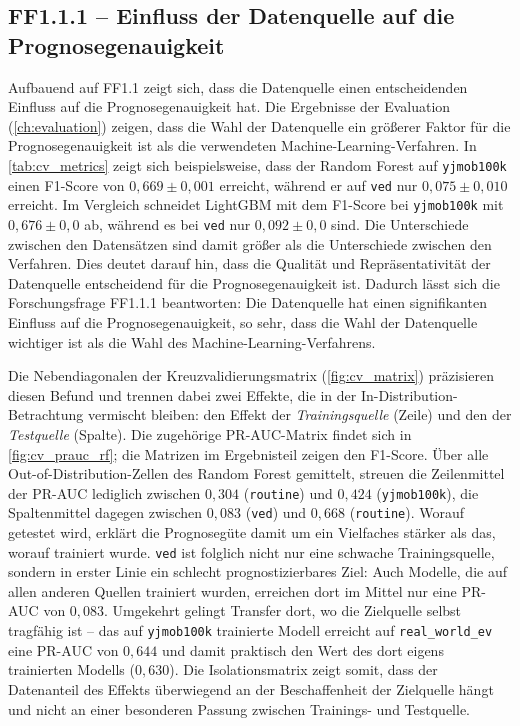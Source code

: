 \subsection{FF1.1.1 -- Einfluss der Datenquelle auf die Prognosegenauigkeit}

Aufbauend auf FF1.1 zeigt sich, dass die Datenquelle einen entscheidenden Einfluss auf die Prognosegenauigkeit hat. Die Ergebnisse der Evaluation (\cref{ch:evaluation}) zeigen, dass die Wahl der Datenquelle ein größerer Faktor für die Prognosegenauigkeit ist als die verwendeten Machine-Learning-Verfahren. In \cref{tab:cv_metrics} zeigt sich beispielsweise, dass der Random Forest auf \texttt{yjmob100k} einen F1-Score von $0,669\pm0,001$ erreicht, während er auf \texttt{ved} nur $0,075\pm0,010$ erreicht. Im Vergleich schneidet LightGBM mit dem F1-Score bei \texttt{yjmob100k} mit $0,676\pm0,0$ ab, während es bei \texttt{ved} nur $0,092\pm0,0$ sind. Die Unterschiede zwischen den Datensätzen sind damit größer als die Unterschiede zwischen den Verfahren. Dies deutet darauf hin, dass die Qualität und Repräsentativität der Datenquelle entscheidend für die Prognosegenauigkeit ist. Dadurch lässt sich die Forschungsfrage FF1.1.1 beantworten: Die Datenquelle hat einen signifikanten Einfluss auf die Prognosegenauigkeit, so sehr, dass die Wahl der Datenquelle wichtiger ist als die Wahl des Machine-Learning-Verfahrens.

Die Nebendiagonalen der Kreuzvalidierungsmatrix (\cref{fig:cv_matrix}) präzisieren diesen Befund und trennen dabei zwei Effekte, die in der In-Distribution-Betrachtung vermischt bleiben: den Effekt der \emph{Trainingsquelle} (Zeile) und den der \emph{Testquelle} (Spalte). Die zugehörige PR-AUC-Matrix findet sich in \cref{fig:cv_prauc_rf}; die Matrizen im Ergebnisteil zeigen den F1-Score. Über alle Out-of-Distribution-Zellen des Random Forest gemittelt, streuen die Zeilenmittel der PR-AUC lediglich zwischen $0,304$ (\texttt{routine}) und $0,424$ (\texttt{yjmob100k}), die Spaltenmittel dagegen zwischen $0,083$ (\texttt{ved}) und $0,668$ (\texttt{routine}). Worauf getestet wird, erklärt die Prognosegüte damit um ein Vielfaches stärker als das, worauf trainiert wurde. \texttt{ved} ist folglich nicht nur eine schwache Trainingsquelle, sondern in erster Linie ein schlecht prognostizierbares Ziel: Auch Modelle, die auf allen anderen Quellen trainiert wurden, erreichen dort im Mittel nur eine PR-AUC von $0,083$. Umgekehrt gelingt Transfer dort, wo die Zielquelle selbst tragfähig ist -- das auf \texttt{yjmob100k} trainierte Modell erreicht auf \texttt{real\_world\_ev} eine PR-AUC von $0,644$ und damit praktisch den Wert des dort eigens trainierten Modells ($0,630$). Die Isolationsmatrix zeigt somit, dass der Datenanteil des Effekts überwiegend an der Beschaffenheit der Zielquelle hängt und nicht an einer besonderen Passung zwischen Trainings- und Testquelle.

